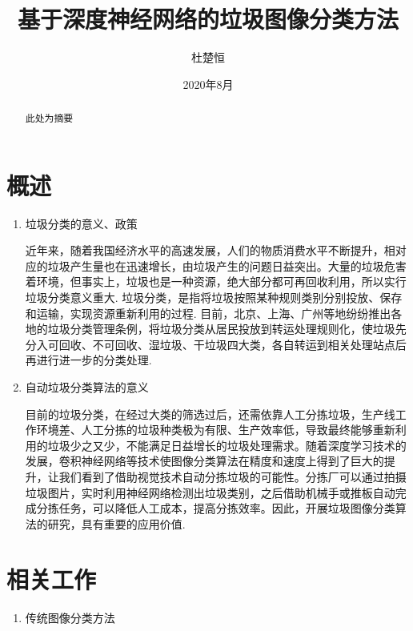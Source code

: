 \documentclass[a4paper]{article}
\title{基于深度神经网络的垃圾图像分类方法}
\author{杜楚恒}
\date{2020年8月}
\begin{document}
\begin{CJK*}{UTF8}{gbsn}

\maketitle

\renewcommand{\abstractname}{摘要}
\begin{abstract}
此处为摘要
\end{abstract}

\section{概述}
\begin{enumerate}
\item 垃圾分类的意义、政策

近年来，随着我国经济水平的高速发展，人们的物质消费水平不断提升，相对应的垃圾产生量也在迅速增长，由垃圾产生的问题日益突出。大量的垃圾危害着环境，但事实上，垃圾也是一种资源，绝大部分都可再回收利用，所以实行垃圾分类意义重大.
垃圾分类，是指将垃圾按照某种规则类别分别投放、保存和运输，实现资源重新利用的过程.
目前，北京、上海、广州等地纷纷推出各地的垃圾分类管理条例，将垃圾分类从居民投放到转运处理规则化，使垃圾先分入可回收、不可回收、湿垃圾、干垃圾四大类，各自转运到相关处理站点后再进行进一步的分类处理.

\item 自动垃圾分类算法的意义

目前的垃圾分类，在经过大类的筛选过后，还需依靠人工分拣垃圾，生产线工作环境差、人工分拣的垃圾种类极为有限、生产效率低，导致最终能够重新利用的垃圾少之又少，不能满足日益增长的垃圾处理需求。随着深度学习技术的发展，卷积神经网络等技术使图像分类算法在精度和速度上得到了巨大的提升，让我们看到了借助视觉技术自动分拣垃圾的可能性。分拣厂可以通过拍摄垃圾图片，实时利用神经网络检测出垃圾类别，之后借助机械手或推板自动完成分拣任务，可以降低人工成本，提高分拣效率。因此，开展垃圾图像分类算法的研究，具有重要的应用价值.

\end{enumerate}

\section{相关工作}
\begin{enumerate}
\item 传统图像分类方法


\end{enumerate}
\end{CJK*}
\end{document}

